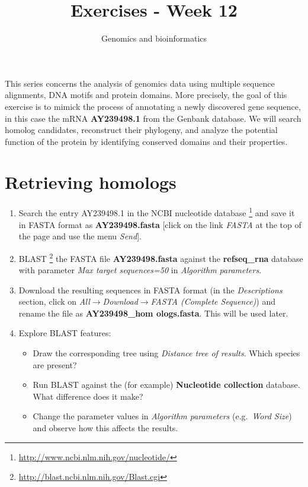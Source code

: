 \documentclass[a4paper,11pt]{article}
\begin{document}
\title{Exercises - Week 12}
\date{}
\author{Genomics and bioinformatics}
\maketitle

This series concerns the analysis of genomics data using multiple sequence alignments, DNA motifs and protein domains. More precisely, the goal of this exercise is to mimick the process of
annotating a newly discovered gene sequence, in this case the mRNA \textbf{AY239498.1} from the Genbank database. We will search homolog candidates, reconstruct their phylogeny, and analyze the potential function of the protein by identifying conserved domains and their properties.

\section{Retrieving homologs}

\begin{enumerate}
\item Search the entry AY239498.1 in the
  NCBI nucleotide database \footnote{\url{http://www.ncbi.nlm.nih.gov/nucleotide/}} and save it in
  FASTA format as \textbf{AY239498.fasta} [click on the link \textit{FASTA} at the top of the page and use the menu \textit{Send}].
\item BLAST \footnote{\url{http://blast.ncbi.nlm.nih.gov/Blast.cgi}}
  the FASTA file \textbf{AY239498.fasta} against the
  \textbf{refseq\_rna} database with parameter \textit{Max target
  sequences=50} in \textit{Algorithm parameters}. 
\item Download the resulting sequences in FASTA format (in the \textit{Descriptions} section, click on
  \textit{All$\rightarrow$Download$\rightarrow$FASTA (Complete Sequence)})
  and rename the file as \textbf{AY239498\_hom ologs.fasta}. This will be used
  later. 
\item Explore BLAST features: 
\begin{itemize}
\item Draw the corresponding tree using \textit{Distance tree of results}. Which species are present?
\item Run BLAST against the (for example) \textbf{Nucleotide collection} database. What difference does it
  make? 
\item Change the parameter values in \textit{Algorithm parameters}
  (e.g.\ \textit{Word Size}) and observe how this affects the results.
\end{itemize}
\end{enumerate}
\end{document}
